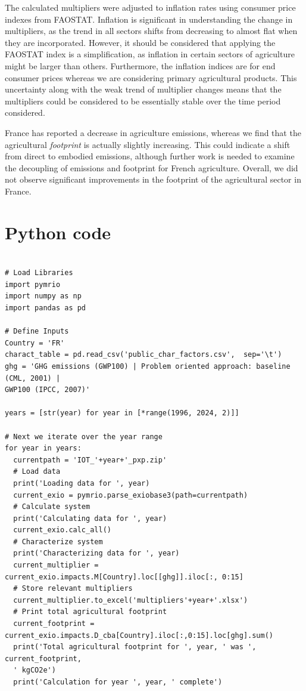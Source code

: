 \documentclass[a4paper,twoside]{article}
\begin{document}
The calculated multipliers were adjusted to inflation rates using consumer price indexes from FAOSTAT. Inflation is significant in understanding the change in multipliers, as the trend in all sectors shifts from decreasing to almost flat when they are incorporated. However, it should be considered that applying the FAOSTAT index is a simplification, as inflation in certain sectors of agriculture might be larger than others. Furthermore, the inflation indices are for end consumer prices whereas we are considering primary agricultural products. This uncertainty along with the weak trend of multiplier changes means that the multipliers could be considered to be essentially stable over the time period considered. 

France has reported a decrease in agriculture emissions, whereas we find that the agricultural \emph{footprint} is actually slightly increasing. This could indicate a shift from direct to embodied emissions, although further work is needed to examine the decoupling of emissions and footprint for French agriculture. Overall, we did not observe significant improvements in the footprint of the agricultural sector in France.




\appendix

\section{Python code}

\begin{lstlisting}

# Load Libraries
import pymrio
import numpy as np
import pandas as pd

# Define Inputs
Country = 'FR'
charact_table = pd.read_csv('public_char_factors.csv',  sep='\t')
ghg = 'GHG emissions (GWP100) | Problem oriented approach: baseline (CML, 2001) | 
GWP100 (IPCC, 2007)'

years = [str(year) for year in [*range(1996, 2024, 2)]]

# Next we iterate over the year range
for year in years:
  currentpath = 'IOT_'+year+'_pxp.zip'
  # Load data
  print('Loading data for ', year)
  current_exio = pymrio.parse_exiobase3(path=currentpath)
  # Calculate system
  print('Calculating data for ', year)
  current_exio.calc_all()
  # Characterize system
  print('Characterizing data for ', year)
  current_multiplier = current_exio.impacts.M[Country].loc[[ghg]].iloc[:, 0:15]
  # Store relevant multipliers
  current_multiplier.to_excel('multipliers'+year+'.xlsx')
  # Print total agricultural footprint
  current_footprint = current_exio.impacts.D_cba[Country].iloc[:,0:15].loc[ghg].sum()
  print('Total agricultural footprint for ', year, ' was ', current_footprint, 
  ' kgCO2e')
  print('Calculation for year ', year, ' complete')
  
\end{lstlisting}
\end{document}
